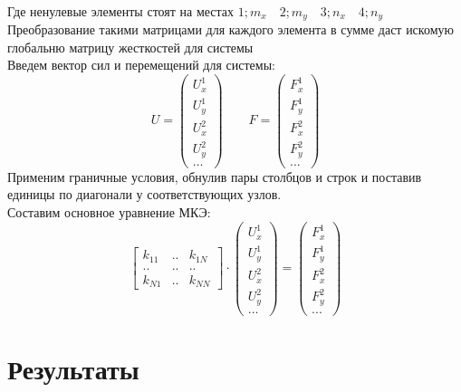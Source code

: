 \documentclass[12pt,a4paper]{article}
\begin{document}
\\
Где ненулевые элементы стоят на местах $1;m_x \quad 2;m_y \quad 3;n_x  \quad 4;n_y$
Преобразование такими матрицами для каждого элемента в сумме даст искомую глобальню матрицу жесткостей для системы\\
Введем вектор сил и перемещений для системы:
\begin{equation*}
	U=
	\begin{pmatrix}
		U_x^1 \\
		U_y^1 \\
		U_x^2\\
		U_y^2\\
		...
	\end{pmatrix}
	\qquad
	F=
	\begin{pmatrix}
		F_x^1 \\
		F_y^1 \\
		F_x^2\\
		F_y^2\\
		...
	\end{pmatrix}
\end{equation*}
Применим граничные условия, обнулив пары столбцов и строк и поставив единицы по диагонали у соответствующих узлов.\\
Составим основное уравнение МКЭ:
\begin{equation*}
	\begin{bmatrix}
		k_{11} &..&k_{1N}\\
		..&..&..\\
		k_{N1}&..&k_{NN}
	\end{bmatrix} \cdot
	\begin{pmatrix}
		U_x^1 \\
		U_y^1 \\
		U_x^2\\
		U_y^2\\
		...
	\end{pmatrix}=
	\begin{pmatrix}
		F_x^1 \\
		F_y^1 \\
		F_x^2\\
		F_y^2\\
		...
	\end{pmatrix}
\end{equation*}
\section{Результаты}
\end{document}

